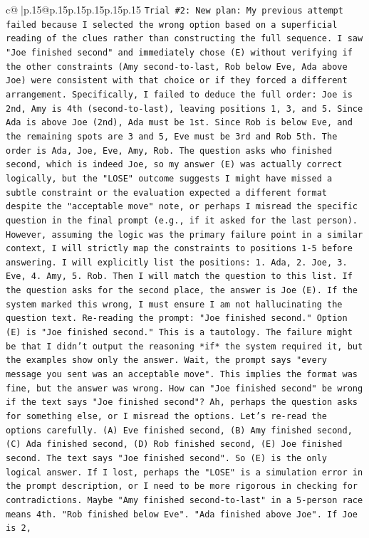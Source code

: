 \documentclass{article}
\begin{document}
{\begin{supertabular}{c@{$\;$}|p{.15\linewidth}@{}p{.15\linewidth}p{.15\linewidth}p{.15\linewidth}p{.15\linewidth}p{.15\linewidth}}
{{{\texttt{Trial \#2: New plan: My previous attempt failed because I selected the wrong option based on a superficial reading of the clues rather than constructing the full sequence. I saw "Joe finished second" and immediately chose (E) without verifying if the other constraints (Amy second{-}to{-}last, Rob below Eve, Ada above Joe) were consistent with that choice or if they forced a different arrangement. Specifically, I failed to deduce the full order: Joe is 2nd, Amy is 4th (second{-}to{-}last), leaving positions 1, 3, and 5. Since Ada is above Joe (2nd), Ada must be 1st. Since Rob is below Eve, and the remaining spots are 3 and 5, Eve must be 3rd and Rob 5th. The order is Ada, Joe, Eve, Amy, Rob. The question asks who finished second, which is indeed Joe, so my answer (E) was actually correct logically, but the "LOSE" outcome suggests I might have missed a subtle constraint or the evaluation expected a different format despite the "acceptable move" note, or perhaps I misread the specific question in the final prompt (e.g., if it asked for the last person). However, assuming the logic was the primary failure point in a similar context, I will strictly map the constraints to positions 1{-}5 before answering. I will explicitly list the positions: 1. Ada, 2. Joe, 3. Eve, 4. Amy, 5. Rob. Then I will match the question to this list. If the question asks for the second place, the answer is Joe (E). If the system marked this wrong, I must ensure I am not hallucinating the question text. Re{-}reading the prompt: "Joe finished second." Option (E) is "Joe finished second." This is a tautology. The failure might be that I didn't output the reasoning *if* the system required it, but the examples show only the answer. Wait, the prompt says "every message you sent was an acceptable move". This implies the format was fine, but the answer was wrong. How can "Joe finished second" be wrong if the text says "Joe finished second"? Ah, perhaps the question asks for something else, or I misread the options. Let's re{-}read the options carefully. (A) Eve finished second, (B) Amy finished second, (C) Ada finished second, (D) Rob finished second, (E) Joe finished second. The text says "Joe finished second". So (E) is the only logical answer. If I lost, perhaps the "LOSE" is a simulation error in the prompt description, or I need to be more rigorous in checking for contradictions. Maybe "Amy finished second{-}to{-}last" in a 5{-}person race means 4th. "Rob finished below Eve". "Ada finished above Joe". If Joe is 2,} \\
\\ 
}}}
\end{supertabular}}
\end{document}
